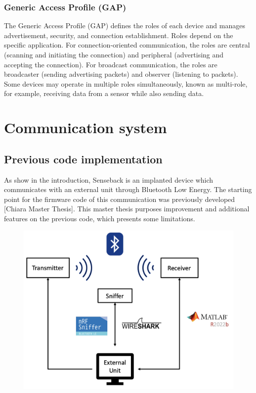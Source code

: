 \documentclass{Configuration_Files/PoliMi3i_thesis}
\begin{document}
\subsubsection{Generic Access Profile (GAP)}
The Generic Access Profile (GAP) defines the roles of each device and manages advertisement, security, and connection establishment. Roles depend on the specific application. For connection-oriented communication, the roles are central (scanning and initiating the connection) and peripheral (advertising and accepting the connection). For broadcast communication, the roles are broadcaster (sending advertising packets) and observer (listening to packets). Some devices may operate in multiple roles simultaneously, known as multi-role, for example, receiving data from a sensor while also sending data.


\section{Communication system}

\subsection{Previous code implementation}

As show in the introduction, Senseback is an implanted device which communicates with an external unit through Bluetooth Low Energy. The starting point for the firmware code of this communication was previously developed [Chiara Master Thesis]. This master thesis purposes improvement and additional features on the previous code, which presents some limitations.

\begin{figure}[H]
	\includegraphics[scale=0.3]{prev1.png}
	\centering
\end{figure}
\end{document}
